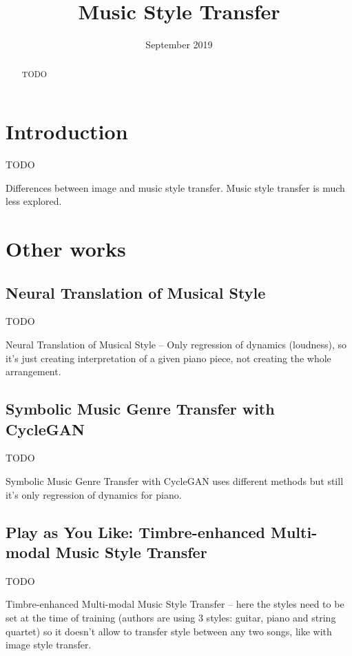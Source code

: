 \documentclass[en]{pracamgr}
\title{Music Style Transfer}
\date{September 2019}
\begin{document}
\maketitle

\begin{abstract}
  TODO
\end{abstract}

\tableofcontents

\chapter{Introduction}

TODO

Differences between image and music style transfer. Music style transfer is much less explored.

\chapter{Other works}

\section{Neural Translation of Musical Style}

TODO

Neural Translation of Musical Style \cite{neural_translation} -- Only regression of dynamics (loudness), so it's just creating interpretation of a given piano piece, not creating the whole arrangement.

\section{Symbolic Music Genre Transfer with CycleGAN}

TODO

Symbolic Music Genre Transfer with CycleGAN \cite{cyclegan} uses different methods but still it's only regression of dynamics for piano.

\section{Play as You Like: Timbre-enhanced Multi-modal Music Style Transfer}

TODO

Timbre-enhanced Multi-modal Music Style Transfer \cite{multimodal} -- here the styles need to be set at the time of training (authors are using 3 styles: guitar, piano and string quartet) so it doesn't allow to transfer style between any two songs, like with image style transfer.
\end{document}
